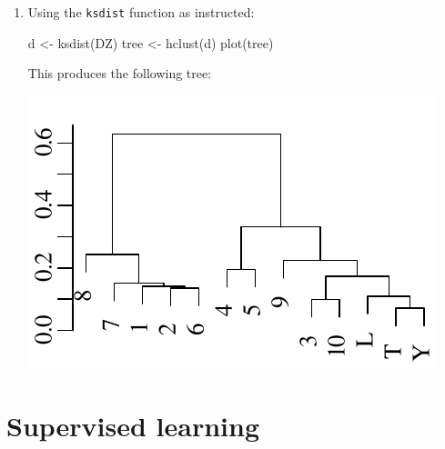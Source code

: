 \begin{enumerate}
\item Using the \texttt{ksdist} function as instructed:

\begin{script}
d <- ksdist(DZ)
tree <- hclust(d)
plot(tree)
\end{script}

This produces the following tree:

\noindent\begin{minipage}[t][][b]{.35\linewidth}
\includegraphics[]{../figures/DZtree.pdf}\medskip
\end{minipage}
\begin{minipage}[t][][t]{.65\linewidth}
  \label{fig:DZtree}
\end{minipage}

\end{enumerate}

\section{Supervised learning}
\label{sec:sol-supervised}


